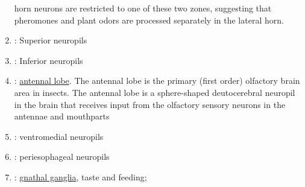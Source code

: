 \begin{enumerate}
         horn neurons are restricted to one of these two zones, suggesting that pheromones and plant odors are processed separately in the lateral horn.
    \item {}: Superior neuropils
    \item {}: Inferior neuropils
    \item {}: \href{https://en.wikipedia.org/wiki/Antennal_lobe}{antennal lobe}.
    The antennal lobe is the primary (first order) olfactory brain area in insects. 
    The antennal lobe is a sphere-shaped deutocerebral neuropil in the brain that receives input
     from the olfactory sensory neurons in the antennae and mouthparts
    \item {}: ventromedial neuropils
    \item {}: periesophageal neuropils
    \item {}: \href{https://www.sdbonline.org/sites/fly/aimorph/subesophagealganglion.htm}{gnathal ganglia}, taste and feeding;
\end{enumerate}

